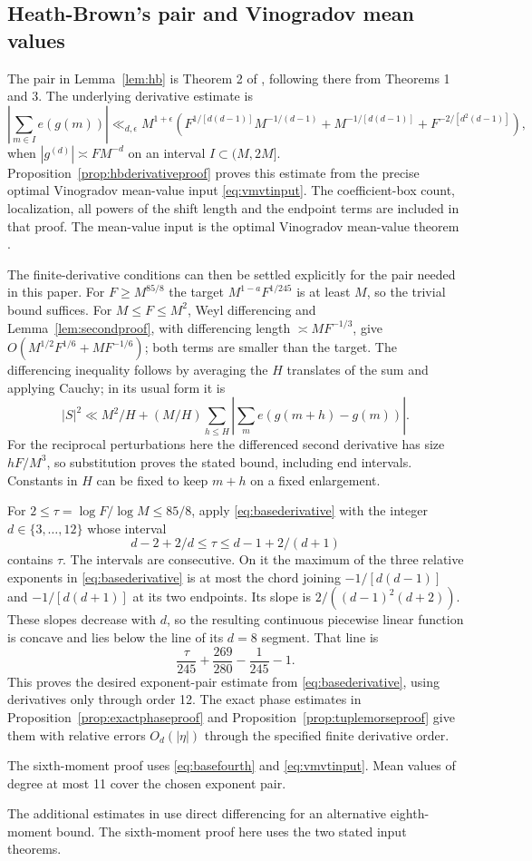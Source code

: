 \subsection{Heath-Brown's pair and Vinogradov mean values}
The pair in Lemma~\ref{lem:hb} is Theorem 2 of \cite{HB17}, following
there from Theorems 1 and 3. The underlying derivative estimate is
\begin{equation}\label{eq:basederivative}
 \left|\sum_{m\in I}e(g(m))\right|
 \ll_{d,\epsilon}M^{1+\epsilon}
 \left(F^{1/[d(d-1)]}M^{-1/(d-1)}
       +M^{-1/[d(d-1)]}+F^{-2/[d^2(d-1)]}\right),
\end{equation}
when $|g^{(d)}|\asymp FM^{-d}$ on an interval $I\subset(M,2M]$.
Proposition~\ref{prop:hbderivativeproof} proves this estimate from the
precise optimal Vinogradov mean-value input \eqref{eq:vmvtinput}.
The coefficient-box count, localization, all powers of the shift length
and the endpoint terms are included in that proof. The mean-value
input is the optimal Vinogradov mean-value theorem \cite{BDG16,Woo16}.

The finite-derivative conditions can then be settled explicitly
for the pair needed in this paper. For $F\ge M^{85/8}$ the target
$M^{1-a}F^{1/245}$ is at least $M$, so the trivial bound suffices.
For $M\le F\le M^2$, Weyl differencing and
Lemma~\ref{lem:secondproof}, with differencing length
$\asymp M F^{-1/3}$, give
$O(M^{1/2}F^{1/6}+M F^{-1/6})$; both terms are smaller than the
target. The differencing inequality follows by averaging the $H$
translates of the sum and applying Cauchy; in its usual form it is
\[
 |S|^2\ll M^2/H+(M/H)\sum_{h\le H}
 \left|\sum_m e(g(m+h)-g(m))\right|.
\]
For the reciprocal perturbations here the differenced second derivative
has size $hF/M^3$, so substitution proves the stated bound, including
end intervals. Constants in $H$ can be fixed to keep $m+h$ on a fixed
enlargement.

For $2\le\tau=\log F/\log M\le85/8$, apply
\eqref{eq:basederivative} with the integer $d\in\{3,\ldots,12\}$
whose interval
\[
 d-2+2/d\le\tau\le d-1+2/(d+1)
\]
contains $\tau$. The intervals are consecutive.
On it the maximum of the three relative exponents in
\eqref{eq:basederivative} is at most the chord joining
$-1/[d(d-1)]$ and $-1/[d(d+1)]$ at its two endpoints.
Its slope is $2/((d-1)^2(d+2))$. These slopes decrease with $d$,
so the resulting continuous piecewise linear function is concave and
lies below the line of its $d=8$ segment. That line is
\[
 \frac{\tau}{245}+\frac{269}{280}-\frac1{245}-1.
\]
This proves the desired exponent-pair estimate from
\eqref{eq:basederivative}, using derivatives only through order 12.
The exact phase estimates in Proposition~\ref{prop:exactphaseproof}
and Proposition~\ref{prop:tuplemorseproof} give them with relative
errors $O_d(|\eta|)$ through the specified finite derivative order.

The sixth-moment proof uses \eqref{eq:basefourth} and
\eqref{eq:vmvtinput}. Mean values of degree at most 11 cover the
chosen exponent pair.

The additional estimates in \cite{Supp} use direct differencing for
an alternative eighth-moment bound. The sixth-moment proof here uses
the two stated input theorems.
